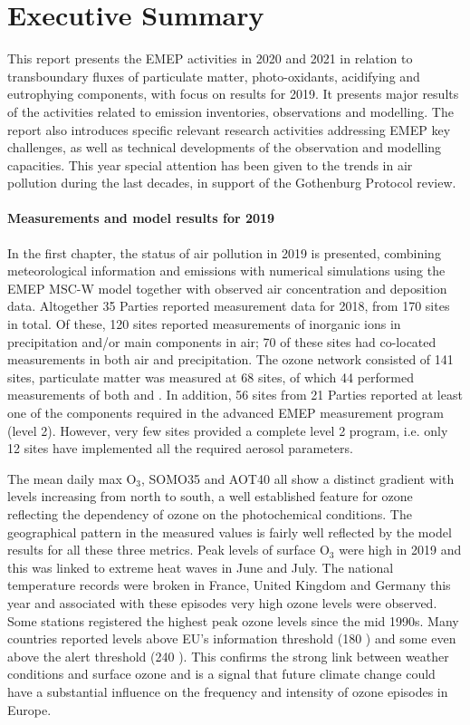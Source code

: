 \chapter*{Executive Summary}


This report presents the EMEP activities in 2020 and 2021 in relation to transboundary
fluxes of particulate matter, photo-oxidants, acidifying and
eutrophying components, with focus on results
for 2019. It presents major results of the activities related to
emission inventories, observations and modelling. The report also
introduces specific relevant research activities addressing EMEP key
challenges, as well as technical developments of the observation and
modelling capacities. This year special attention has been given to the trends in air pollution during the last decades, in support of the Gothenburg Protocol review.

\subsubsection*{Measurements and model results for 2019} %
In the first chapter, the status of air pollution in 2019 is presented, combining 
meteorological information and emissions with numerical simulations using the EMEP MSC-W model together with observed air concentration and deposition data.
Altogether 35 Parties reported measurement data for 2018, from 170 sites in total. 
Of these, 120 sites reported measurements of inorganic ions in precipitation and/or 
main components in air; 70 of these sites had co-located measurements in both air and 
precipitation. The ozone network consisted of 141 sites, particulate matter was measured at 
68 sites, of which 44 performed measurements of both \PM[10] and \PM[2.5]. 
In addition, 56 sites from 21 Parties reported at least one of the components required in the advanced EMEP measurement program (level 2). However, very few sites provided a complete level 2 program, i.e. only 12 sites have implemented all the required aerosol parameters. 

The mean daily max O$_3$, SOMO35 and AOT40 all show a distinct gradient with levels increasing from north to south, a well established feature for ozone reflecting the dependency of ozone on the photochemical conditions. The geographical pattern in the measured values is fairly well reflected by the model results for all these three metrics. Peak levels of surface O$_3$ were high in 2019 and this was linked to extreme heat waves in June and July. The national temperature records were broken in France, United Kingdom and Germany this year and associated with these episodes very high ozone levels were observed. Some stations registered the highest peak ozone levels since the mid 1990s. Many countries reported levels above EU's information threshold (180 \ug) and some even above the alert threshold (240 \ug). This confirms the strong link between weather conditions and surface ozone and is a signal that future climate change could have a substantial influence on the frequency and intensity of ozone episodes in Europe.

